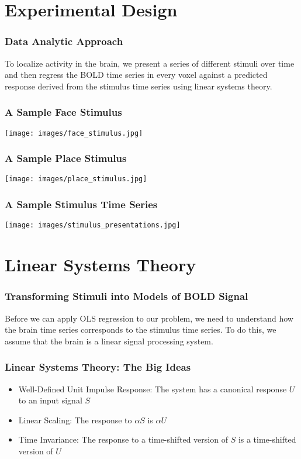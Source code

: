 \documentclass{beamer}
\begin{document}
\section{Experimental Design}

\frame
{
	\frametitle{Data Analytic Approach}
	
	To localize activity in the brain, we present a series of different stimuli over time and then regress the BOLD time series in every voxel against a predicted response derived from the stimulus time series using linear systems theory.
}

\frame
{
  \frametitle{A Sample Face Stimulus}

  \begin{center}
    \texttt{[image: images/face\_stimulus.jpg]}
  \end{center}
}

\frame
{
  \frametitle{A Sample Place Stimulus}

  \begin{center}
    \texttt{[image: images/place\_stimulus.jpg]}
  \end{center}
}

\frame
{
  \frametitle{A Sample Stimulus Time Series}

  \begin{center}
    \texttt{[image: images/stimulus\_presentations.jpg]}
  \end{center}
}

\section{Linear Systems Theory}

\frame
{
  \frametitle{Transforming Stimuli into Models of BOLD Signal}
  
  Before we can apply OLS regression to our problem, we need to understand how the brain time series corresponds to the stimulus time series. To do this, we assume that the brain is a linear signal processing system.
}

\frame
{
	\frametitle{Linear Systems Theory: The Big Ideas}

	\begin{itemize}
  		\item{Well-Defined Unit Impulse Response: The system has a canonical response $U$ to an input signal $S$}
		\item{Linear Scaling: The response to $\alpha S$ is $\alpha U$}
		\item{Time Invariance: The response to a time-shifted version of $S$ is a time-shifted version of $U$}
	\end{itemize}
}
\end{document}
